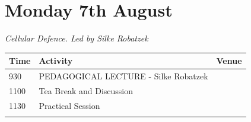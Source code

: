 \documentclass[12pt,]{book}
\begin{document}
\section*{Monday 7th August}\label{monday-7th-august}

\emph{Cellular Defence. Led by Silke Robatzek}

\begin{longtable}[]{@{}lll@{}}
\toprule
\begin{minipage}[b]{0.09\columnwidth}\raggedright\strut
Time\strut
\end{minipage} & \begin{minipage}[b]{0.39\columnwidth}\raggedright\strut
Activity\strut
\end{minipage} & \begin{minipage}[b]{0.13\columnwidth}\raggedright\strut
Venue\strut
\end{minipage}\tabularnewline
\midrule
\endhead
\begin{minipage}[t]{0.09\columnwidth}\raggedright\strut
930\strut
\end{minipage} & \begin{minipage}[t]{0.39\columnwidth}\raggedright\strut
PEDAGOGICAL LECTURE - Silke Robatzek\strut
\end{minipage} & \begin{minipage}[t]{0.13\columnwidth}\raggedright\strut
\strut
\end{minipage}\tabularnewline
\begin{minipage}[t]{0.09\columnwidth}\raggedright\strut
1100\strut
\end{minipage} & \begin{minipage}[t]{0.39\columnwidth}\raggedright\strut
Tea Break and Discussion\strut
\end{minipage} & \begin{minipage}[t]{0.13\columnwidth}\raggedright\strut
\strut
\end{minipage}\tabularnewline
\begin{minipage}[t]{0.09\columnwidth}\raggedright\strut
1130\strut
\end{minipage} & \begin{minipage}[t]{0.39\columnwidth}\raggedright\strut
Practical Session\strut
\end{minipage} & \begin{minipage}[t]{0.13\columnwidth}\raggedright\strut
\strut
\end{minipage}\tabularnewline
\begin{minipage}[t]{0.09\columnwidth}\raggedright\strut

\end{minipage}
\end{longtable}
\end{document}
